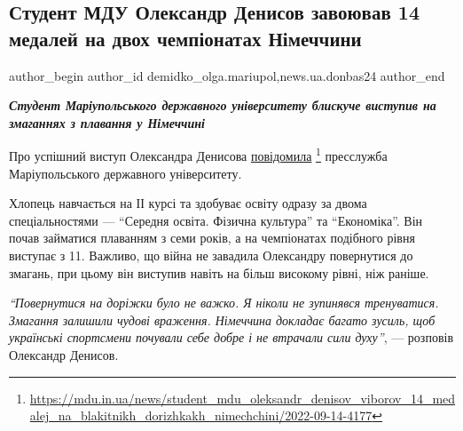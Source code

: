  
 
 
 
 
 
\subsection{Студент МДУ Олександр Денисов завоював 14 медалей на двох чемпіонатах Німеччини}
\label{sec:14_09_2022.stz.news.ua.donbas24.1.student_mdu_oleksandr_denisov_14_medalej}
 
\ifcmt
 author_begin
   author_id demidko_olga.mariupol,news.ua.donbas24
 author_end
\fi

\begin{center}
  \em\color{blue}\bfseries\Large
Студент Маріупольського державного університету блискуче виступив на змаганнях
з плавання у Німеччині
\end{center}

Про успішний виступ Олександра Денисова \href{https://mdu.in.ua/news/student_mdu_oleksandr_denisov_viborov_14_medalej_na_blakitnikh_dorizhkakh_nimechchini/2022-09-14-4177}{повідомила}%
\footnote{\url{https://mdu.in.ua/news/student_mdu_oleksandr_denisov_viborov_14_medalej_na_blakitnikh_dorizhkakh_nimechchini/2022-09-14-4177}} пресслужба Маріупольського державного університету.

Хлопець навчається на ІІ курсі та здобуває освіту одразу за двома
спеціальностями — \enquote{Середня освіта. Фізична культура} та \enquote{Економіка}. Він почав
займатися плаванням з семи років, а на чемпіонатах подібного рівня виступає з
11. Важливо, що війна не завадила Олександру повернутися до змагань, при цьому
він виступив навіть на більш високому рівні, ніж раніше.

\begin{leftbar}
\emph{\enquote{Повернутися на доріжки було не важко. Я ніколи не зупинявся тренуватися.
Змагання залишили чудові враження. Німеччина докладає багато зусиль, щоб
українські спортсмени почували себе добре і не втрачали сили духу}}, — розповів
Олександр Денисов.
\end{leftbar}

